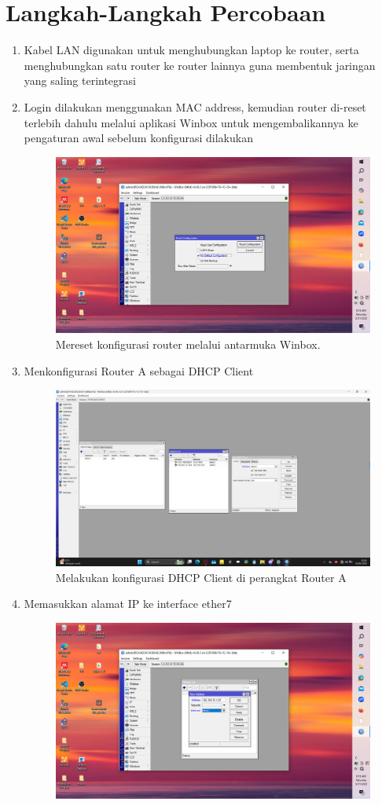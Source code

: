 \section{Langkah-Langkah Percobaan}
\begin{enumerate}
    \item Kabel LAN digunakan untuk menghubungkan laptop ke router, serta menghubungkan satu router ke router lainnya guna membentuk jaringan yang saling terintegrasi
    \item Login dilakukan menggunakan MAC address, kemudian router di-reset terlebih dahulu melalui aplikasi Winbox untuk mengembalikannya ke pengaturan awal sebelum konfigurasi dilakukan
    \begin{figure}[H]
        \centering
        \includegraphics[width=0.5\linewidth]{P1/img/gambar1.jpeg}
        \caption{Mereset konfigurasi router melalui antarmuka Winbox.}
        \label{fig:reset-router}
    \end{figure}
    \item Menkonfigurasi Router A sebagai DHCP Client
    \begin{figure}[H]
        \centering
        \includegraphics[width=0.5\linewidth]{P1/img/gambar2.jpeg}
        \caption{Melakukan konfigurasi DHCP Client di perangkat Router A}
        \label{fig:DHCP-router-A}
    \end{figure}
    \item Memasukkan alamat IP ke interface ether7
    \begin{figure}[H]
        \centering
        \includegraphics[width=0.5\linewidth]{P1/img/gambar3.jpeg}

\end{figure}
\end{enumerate}
